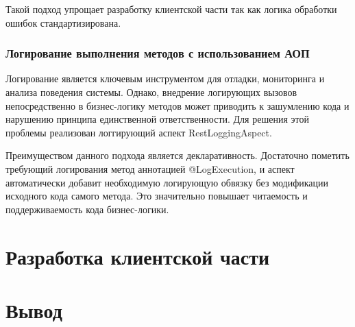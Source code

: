 Такой подход упрощает разработку клиентской части так как логика обработки ошибок стандартизирована.

\subsubsection{Логирование выполнения методов с использованием АОП}

Логирование является ключевым инструментом для отладки, мониторинга и анализа поведения системы.
Однако, внедрение логирующих вызовов непосредственно в бизнес-логику методов может приводить к зашумлению кода и нарушению принципа единственной ответственности.
Для решения этой проблемы реализован логгирующий аспект RestLoggingAspect.

Преимуществом данного подхода является декларативность. Достаточно пометить требующий логирования метод аннотацией @LogExecution, и аспект автоматически добавит необходимую логирующую обвязку без модификации исходного кода самого метода. Это значительно повышает читаемость и поддерживаемость кода бизнес-логики.

\section{Разработка клиентской части}

\section{Вывод}